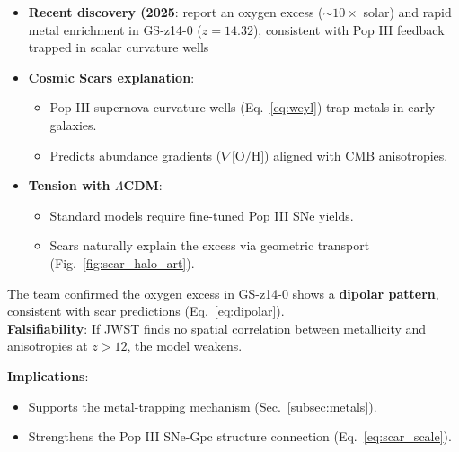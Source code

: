 \documentclass{article}
\begin{document}
\begin{itemize}
    \item \textbf{Recent discovery (2025}: \cite{JADES2025} report an oxygen excess ($\sim 10\times$ solar) and rapid metal enrichment in GS-z14-0 ($z = 14.32$), consistent with Pop III feedback trapped in scalar curvature wells

    \item \textbf{Cosmic Scars explanation}:
    \begin{itemize}
        \item Pop III supernova curvature wells (Eq.~\ref{eq:weyl}) trap metals in early galaxies. 
        \item Predicts abundance gradients ($\nabla\text{[O/H]}$) aligned with CMB anisotropies.
    \end{itemize}

    \item \textbf{Tension with $\Lambda$CDM}:
    \begin{itemize}
        \item Standard models require fine-tuned Pop III SNe yields.
        \item Scars naturally explain the excess via geometric transport (Fig.~\ref{fig:scar_halo_art}).
    \end{itemize}
\end{itemize}

\begin{tcolorbox}
 [colback=boxnormal,
    colframe=blue!50!black,
    title=\textbf{Key Update (April 2025)}
]
The  team confirmed the oxygen excess in GS-z14-0 shows a \textbf{dipolar pattern}, consistent with scar predictions (Eq.~\ref{eq:dipolar}).\\ 
\textbf{Falsifiability}: If JWST finds no spatial correlation between metallicity and anisotropies at $z > 12$, the model weakens.
\end{tcolorbox}

\textbf{Implications}:
\begin{itemize}
    \item Supports the metal-trapping mechanism (Sec.~\ref{subsec:metals}). 
    \item Strengthens the Pop III SNe-Gpc structure connection (Eq.~\ref{eq:scar_scale}). 
\end{itemize}
\end{document}
